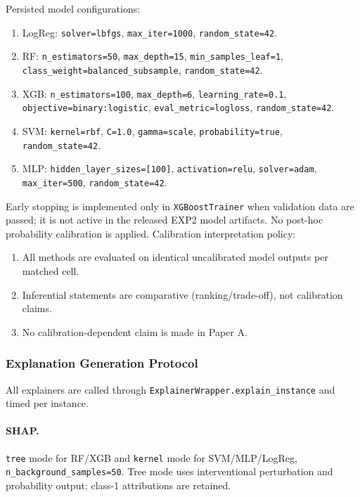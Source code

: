 \documentclass[twoside,11pt]{article}
\begin{document}
Persisted model configurations:
\begin{enumerate}[leftmargin=*]
    \item LogReg: \texttt{solver=lbfgs}, \texttt{max\_iter=1000}, \texttt{random\_state=42}.
    \item RF: \texttt{n\_estimators=50}, \texttt{max\_depth=15},
    \texttt{min\_samples\_leaf=1}, \texttt{class\_weight=balanced\_subsample},
    \texttt{random\_state=42}.
    \item XGB: \texttt{n\_estimators=100}, \texttt{max\_depth=6},
    \texttt{learning\_rate=0.1}, \texttt{objective=binary:logistic},
    \texttt{eval\_metric=logloss}, \texttt{random\_state=42}.
    \item SVM: \texttt{kernel=rbf}, \texttt{C=1.0}, \texttt{gamma=scale},
    \texttt{probability=true}, \texttt{random\_state=42}.
    \item MLP: \texttt{hidden\_layer\_sizes=[100]}, \texttt{activation=relu},
    \texttt{solver=adam}, \texttt{max\_iter=500}, \texttt{random\_state=42}.
\end{enumerate}
Early stopping is implemented only in \texttt{XGBoostTrainer} when validation
data are passed; it is not active in the released EXP2 model artifacts.
No post-hoc probability calibration is applied.
Calibration interpretation policy:
\begin{enumerate}[leftmargin=*]
    \item All methods are evaluated on identical uncalibrated model outputs per matched cell.
    \item Inferential statements are comparative (ranking/trade-off), not calibration claims.
    \item No calibration-dependent claim is made in Paper A.
\end{enumerate}

\subsubsection{Explanation Generation Protocol}
All explainers are called through \texttt{ExplainerWrapper.explain\_instance}
and timed per instance.

\paragraph{SHAP.}
\texttt{tree} mode for RF/XGB and \texttt{kernel} mode for SVM/MLP/LogReg,
\texttt{n\_background\_samples=50}. Tree mode uses interventional perturbation and
probability output; class-1 attributions are retained.
\end{document}
